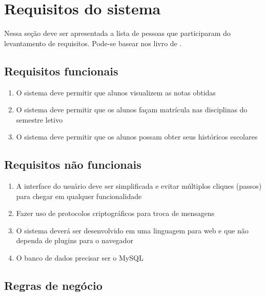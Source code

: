 \documentclass[11pt]{ifscarticle}
\begin{document}
\section{Requisitos do sistema}
\label{sec:requisitos}

Nessa seção deve ser apresentada a lista de pessoas que participaram do levantamento de requisitos. Pode-se basear nos livro de \textcite{bezerra02}.

\lipsum[2]


\subsection{Requisitos funcionais}
\label{sec:reqfuncionais}

\begin{enumerate}
    \item O sistema deve permitir que alunos visualizem as notas obtidas
    \item O sistema deve permitir que os alunos façam matrícula nas disciplinas do semestre letivo
    \item O sistema deve permitir que os alunos possam obter seus históricos escolares
\end{enumerate}

\subsection{Requisitos não funcionais}
\label{sec:reqnaofuncionais}

\begin{enumerate}
    \item A interface do usuário deve ser simplificada e evitar múltiplos cliques (passos) para chegar em qualquer funcionalidade
    \item Fazer uso de protocolos criptográficos para troca de mensagens
    \item O sistema deverá ser desenvolvido em uma linguagem para web e que não dependa de plugins para o navegador
    \item O banco de dados precisar ser o MySQL
\end{enumerate}

\subsection{Regras de negócio}
\label{sec:regrasdenegocio}
\end{document}
